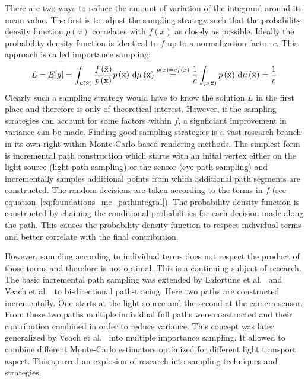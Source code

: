 There are two ways to reduce the amount of variation of the integrand around its mean value. The first is to adjust the sampling strategy such that the probability density function $p\left(x\right)$ correlates with $f\left(x\right)$ as closely as possible. Ideally the probability density function is identical to $f$ up to a normalization factor $c$. This approach is called importance sampling:
\begin{align}
L = E[g] =
\int_{\mu\left(\bar{\mathrm{x}}\right)} \frac{f\left(\bar{\mathrm{x}}\right)}{p\left(\bar{\mathrm{x}}\right)}p\left(\bar{\mathrm{x}}\right)
\,\mathrm{d}\mu\left(\bar{\mathrm{x}}\right)
\stackrel{p\left(x\right)=c f\left(x\right)}{=}
\frac{1}{c}\int_{\mu\left(\bar{\mathrm{x}}\right)} p\left(\bar{\mathrm{x}}\right)
\,\mathrm{d}\mu\left(\bar{\mathrm{x}}\right) = \frac{1}{c}
\end{align}
Clearly such a sampling strategy would have to know the solution $L$ in the first place and therefore is only of theoretical interest. However, if the sampling strategies can account for some factors within $f$, a signficiant improvement in variance can be made. Finding good sampling strategies is a vast research branch in its own right within Monte-Carlo based rendering methods. The simplest form is incremental path construction which starts with an inital vertex either on the light source (light path sampling) or the sensor (eye path sampling) and incrementally samples additional points from which additional path segments are constructed. The random decisions are taken according to the terms in $f$ (see equation~\ref{eq:foundations_mc_pathintegral}). The probability density function is constructed by chaining the conditional probabilities for each decision made along the path. This causes the probability density function to respect individual terms and better correlate with the final contribution. 

However, sampling according to individual terms does not respect the product of those terms and therefore is not optimal. This is a continuing subject of research. The basic incremental path sampling was extended by Lafortune et al.~\cite{Lafortune93} and Veach et al.~\cite{Veach94} to bi-directional path-tracing. Here two paths are constructed incrementally. One starts at the light source and the second at the camera sensor. From these two paths multiple individual full paths were constructed and their contribution combined in order to reduce variance. This concept was later generalized by Veach et al.~\cite{Veach95MIS} into multiple importance sampling. It allowed to combine different Monte-Carlo estimators optimized for different light transport aspect. This spurred an explosion of research into sampling techniques and strategies.

